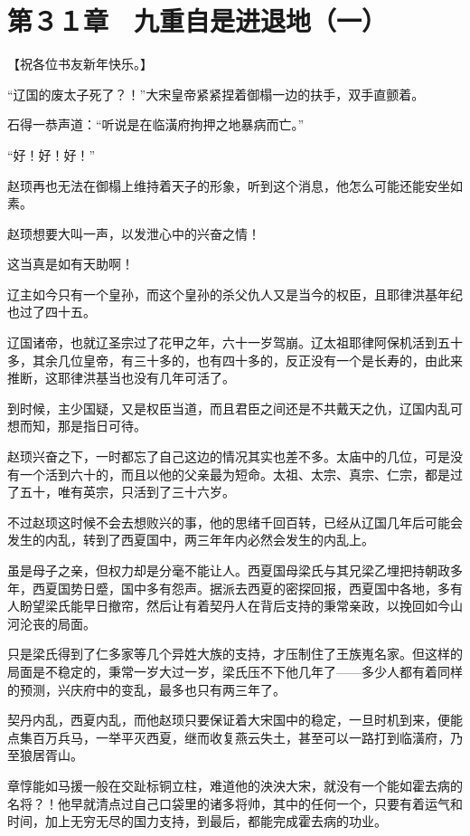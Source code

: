 \section{第３１章　九重自是进退地（一）}

【祝各位书友新年快乐。】

“辽国的废太子死了？！”大宋皇帝紧紧捏着御榻一边的扶手，双手直颤着。

石得一恭声道：“听说是在临潢府拘押之地暴病而亡。”

“好！好！好！”

赵顼再也无法在御榻上维持着天子的形象，听到这个消息，他怎么可能还能安坐如素。

赵顼想要大叫一声，以发泄心中的兴奋之情！

这当真是如有天助啊！

辽主如今只有一个皇孙，而这个皇孙的杀父仇人又是当今的权臣，且耶律洪基年纪也过了四十五。

辽国诸帝，也就辽圣宗过了花甲之年，六十一岁驾崩。辽太祖耶律阿保机活到五十多，其余几位皇帝，有三十多的，也有四十多的，反正没有一个是长寿的，由此来推断，这耶律洪基当也没有几年可活了。

到时候，主少国疑，又是权臣当道，而且君臣之间还是不共戴天之仇，辽国内乱可想而知，那是指日可待。

赵顼兴奋之下，一时都忘了自己这边的情况其实也差不多。太庙中的几位，可是没有一个活到六十的，而且以他的父亲最为短命。太祖、太宗、真宗、仁宗，都是过了五十，唯有英宗，只活到了三十六岁。

不过赵顼这时候不会去想败兴的事，他的思绪千回百转，已经从辽国几年后可能会发生的内乱，转到了西夏国中，两三年年内必然会发生的内乱上。

虽是母子之亲，但权力却是分毫不能让人。西夏国母梁氏与其兄梁乙埋把持朝政多年，西夏国势日蹙，国中多有怨声。据派去西夏的密探回报，西夏国中各地，多有人盼望梁氏能早日撤帘，然后让有着契丹人在背后支持的秉常亲政，以挽回如今山河沦丧的局面。

只是梁氏得到了仁多家等几个异姓大族的支持，才压制住了王族嵬名家。但这样的局面是不稳定的，秉常一岁大过一岁，梁氏压不下他几年了——多少人都有着同样的预测，兴庆府中的变乱，最多也只有两三年了。

契丹内乱，西夏内乱，而他赵顼只要保证着大宋国中的稳定，一旦时机到来，便能点集百万兵马，一举平灭西夏，继而收复燕云失土，甚至可以一路打到临潢府，乃至狼居胥山。

章惇能如马援一般在交趾标铜立柱，难道他的泱泱大宋，就没有一个能如霍去病的名将？！他早就清点过自己口袋里的诸多将帅，其中的任何一个，只要有着运气和时间，加上无穷无尽的国力支持，到最后，都能完成霍去病的功业。

